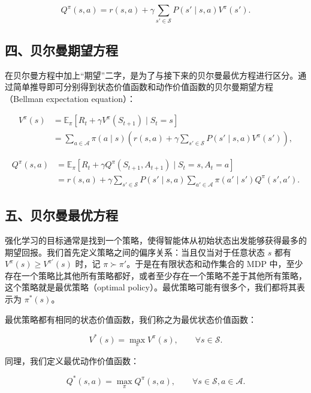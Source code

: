 \[
Q^{\pi}(s,a)=r(s,a)+\gamma\sum_{s'\in\mathcal{S}}P(s'\mid s,a)V^{\pi}(s').
\]

\hypertarget{ux56dbux8d1dux5c14ux66fcux671fux671bux65b9ux7a0b}{%
\subsection{四、贝尔曼期望方程}\label{ux56dbux8d1dux5c14ux66fcux671fux671bux65b9ux7a0b}}

在贝尔曼方程中加上``期望''二字，是为了与接下来的贝尔曼最优方程进行区分。通过简单推导即可分别得到状态价值函数和动作价值函数的贝尔曼期望方程（Bellman expectation equation）：

\[
\begin{aligned}
V^{\pi}(s)
&=\mathbb{E}_{\pi}[R_t+\gamma V^{\pi}(S_{t+1})\mid S_t=s]\\
&=\sum_{a\in\mathcal{A}}\pi(a\mid s)
(r(s,a)+\gamma\sum_{s'\in\mathcal{S}}P(s'\mid s,a)V^{\pi}(s')),
\end{aligned}
\]

\[
\begin{aligned}
Q^{\pi}(s,a)
&=\mathbb{E}_{\pi}[R_t+\gamma Q^{\pi}(S_{t+1},A_{t+1})\mid S_t=s,A_t=a]\\
&=r(s,a)+\gamma\sum_{s'\in\mathcal{S}}P(s'\mid s,a)
\sum_{a'\in\mathcal{A}}\pi(a'\mid s')Q^{\pi}(s',a').
\end{aligned}
\]

\hypertarget{ux4e94ux8d1dux5c14ux66fcux6700ux4f18ux65b9ux7a0b}{%
\subsection{五、贝尔曼最优方程}\label{ux4e94ux8d1dux5c14ux66fcux6700ux4f18ux65b9ux7a0b}}

强化学习的目标通常是找到一个策略，使得智能体从初始状态出发能够获得最多的期望回报。我们首先定义策略之间的偏序关系：当且仅当对于任意状态 \(s\) 都有 \(V^{\pi}(s)\ge V^{\pi'}(s)\) 时，记 \(\pi\succ \pi'\)。于是在有限状态和动作集合的 MDP 中，至少存在一个策略比其他所有策略都好，或者至少存在一个策略不差于其他所有策略，这个策略就是最优策略（optimal policy）。最优策略可能有很多个，我们都将其表示为 \(\pi^{*}(s)\)。

最优策略都有相同的状态价值函数，我们称之为最优状态价值函数：

\[
V^{*}(s)=\max_{\pi}V^{\pi}(s),\qquad \forall s\in\mathcal{S}.
\]

同理，我们定义最优动作价值函数：

\[
Q^{*}(s,a)=\max_{\pi}Q^{\pi}(s,a),\qquad \forall s\in\mathcal{S},a\in\mathcal{A}.
\]

